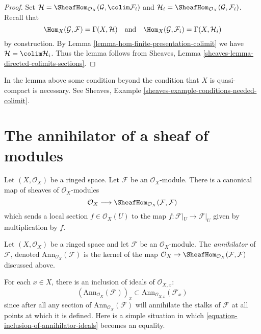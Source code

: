 \begin{proof}
Set
$\mathcal{H} = \SheafHom_{\mathcal{O}_X}(\mathcal{G}, \colim \mathcal{F}_i)$
and $\mathcal{H}_i = \SheafHom_{\mathcal{O}_X}(\mathcal{G}, \mathcal{F}_i)$.
Recall that
$$
\Hom_X(\mathcal{G}, \mathcal{F}) = \Gamma(X, \mathcal{H})
\quad\text{and}\quad
\Hom_X(\mathcal{G}, \mathcal{F}_i) = \Gamma(X, \mathcal{H}_i)
$$
by construction. By Lemma \ref{lemma-hom-finite-presentation-colimit} we have
$\mathcal{H} = \colim \mathcal{H}_i$. Thus the lemma follows from
Sheaves, Lemma \ref{sheaves-lemma-directed-colimits-sections}.
\end{proof}

\begin{remark}
\label{remark-condition-necessary}
In the lemma above some condition beyond the condition that $X$
is quasi-compact is necessary. See
Sheaves, Example \ref{sheaves-example-conditions-needed-colimit}.
\end{remark}




\section{The annihilator of a sheaf of modules}
\label{section-annihilator}

\noindent
Let $(X, \mathcal{O}_X)$ be a ringed space.
Let $\mathcal{F}$ be an $\mathcal{O}_X$-module.
There is a canonical map of sheaves of $\mathcal{O}_X$-modules
$$
\mathcal{O}_X
\longrightarrow
\SheafHom_{\mathcal{O}_X}(\mathcal{F}, \mathcal{F})
$$
which sends a local section $f \in \mathcal{O}_X(U)$ to the map
$f : \mathcal{F}|_U \to \mathcal{F}|_U$ given by multiplication by $f$.

\begin{definition}
\label{definition-annihilator-sheaf}
Let $(X, \mathcal{O}_X)$ be a ringed space and let $\mathcal{F}$
be an $\mathcal{O}_X$-module. The {\it annihilator} of $\mathcal{F}$,
denoted $\text{Ann}_{\mathcal{O}_X}(\mathcal{F})$
is the kernel of the map
$\mathcal{O}_X \to \SheafHom_{\mathcal{O}_X}(\mathcal{F}, \mathcal{F})$
discussed above.
\end{definition}

\noindent
For each $x\in X$, there is an inclusion of ideals of $\mathcal{O}_{X, x}$:
\begin{equation}
\label{equation-inclusion-of-annihilator-ideals}
(\text{Ann}_{\mathcal{O}_X}(\mathcal{F}))_x
\subset
\text{Ann}_{\mathcal{O}_{X, x}}(\mathcal{F}_x)
\end{equation}
since after all any section of $\text{Ann}_{\mathcal{O}_X}(\mathcal{F})$
will annihilate the stalks of $\mathcal{F}$ at all points at which it is
defined. Here is a simple situation in which
\eqref{equation-inclusion-of-annihilator-ideals} becomes an equality.

